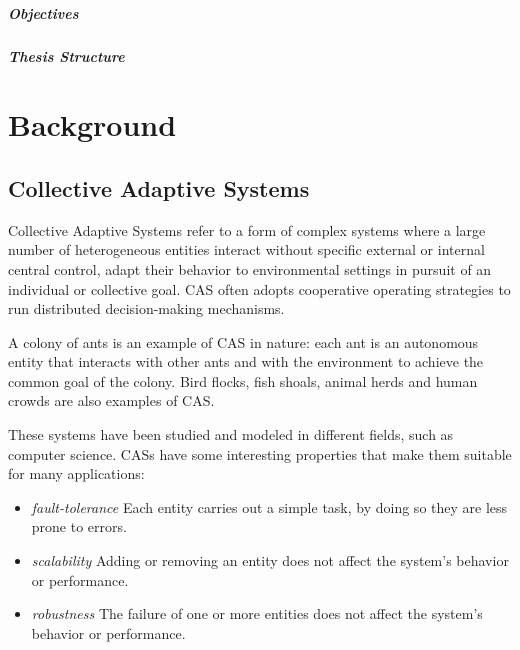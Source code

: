 \documentclass[12pt,a4paper,openright,twoside]{book}
\begin{document}
\paragraph*{Objectives}

\paragraph*{Thesis Structure}

\chapter{Background}

\section{Collective Adaptive Systems}

Collective Adaptive Systems refer to a form of complex systems where a large number of heterogeneous entities interact without specific external or internal central control, 
adapt their behavior to environmental settings in pursuit of an individual or collective goal.
CAS often adopts cooperative operating strategies to run distributed decision-making mechanisms. \cite{DBLP:journals/tomacs/Aldini18}

A colony of ants is an example of CAS in nature: each ant is an autonomous entity that interacts with other ants and with the environment to achieve the common goal of the colony. 
Bird flocks, fish shoals, animal herds and human crowds are also examples of CAS.

These systems have been studied and modeled in different fields, such as computer science.
CASs have some interesting properties that make them suitable for many applications:

\begin{itemize}
  \item \textit{fault-tolerance} Each entity carries out a simple task, by doing so they are less prone to errors.
  \item \textit{scalability} Adding or removing an entity does not affect the system's behavior or performance.
  \item \textit{robustness} The failure of one or more entities does not affect the system's behavior or performance.
\end{itemize}
\end{document}
